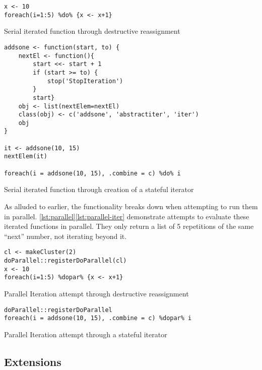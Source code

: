 \begin{listing}
	\begin{verbatim}
x <- 10
foreach(i=1:5) %do% {x <- x+1}
\end{verbatim}
	\caption{Serial iterated function through destructive reassignment}
	\label{lst:serial}
\end{listing}

\begin{listing}
	\begin{verbatim}
addsone <- function(start, to) {
	nextEl <- function(){
		start <<- start + 1
		if (start >= to) {
			stop('StopIteration')
		}
		start}
	obj <- list(nextElem=nextEl)
	class(obj) <- c('addsone', 'abstractiter', 'iter')
	obj
}

it <- addsone(10, 15)
nextElem(it)

foreach(i = addsone(10, 15), .combine = c) %do% i
\end{verbatim}
	\caption{Serial iterated function through creation of a stateful iterator}
	\label{lst:serial-iter}
\end{listing}

As alluded to earlier, the functionality breaks down when attempting to
run them in parallel. \ref{lst:parallel}\ref{lst:parallel-iter}
demonstrate attempts to evaluate these iterated functions in parallel.
They only return a list of 5 repetitions of the same ``next'' number,
not iterating beyond it.

\begin{listing}
	\begin{verbatim}
cl <- makeCluster(2)
doParallel::registerDoParallel(cl)
x <- 10
foreach(i=1:5) %dopar% {x <- x+1}
\end{verbatim}
	\caption{Parallel Iteration attempt through destructive reassignment}
	\label{lst:parallel}
\end{listing}

\begin{listing}
	\begin{verbatim}
doParallel::registerDoParallel
foreach(i = addsone(10, 15), .combine = c) %dopar% i
\end{verbatim}
	\caption{Parallel Iteration attempt through a stateful iterator}
	\label{lst:parallel-iter}
\end{listing}

\subsection*{Extensions}

